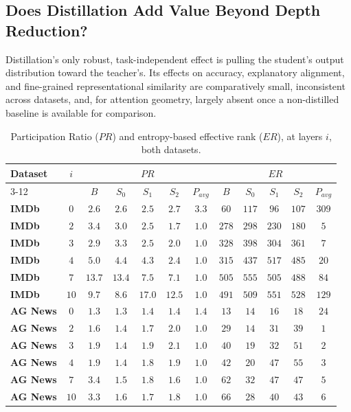 \documentclass[conference]{IEEEtran}
\begin{document}
\subsection{Does Distillation Add Value Beyond Depth Reduction?}\label{sec:distillation-value}

Distillation's only robust, task-independent effect is pulling the student's output distribution toward the teacher's. Its effects on accuracy, explanatory alignment, and fine-grained representational similarity are comparatively small, inconsistent across datasets, and, for attention geometry, largely absent once a non-distilled baseline is available for comparison.

\begin{table}[tb]
\centering
\caption{Participation Ratio ($PR$) and entropy-based effective rank ($ER$), at layers $i$, both datasets.}
\footnotesize
\begin{tabular}{|l|c|c|c|c|c|c|c|c|c|c|c|}
\hline
\multirow{2}{*}{Dataset} & \multirow{2}{*}{$i$} & \multicolumn{5}{c|}{$PR$} & \multicolumn{5}{c|}{$ER$} \\
\cline{3-12}
 & & $B$ & $S_0$ & $S_1$ & $S_2$ & $P_{avg}$ & $B$ & $S_0$ & $S_1$ & $S_2$ & $P_{avg}$ \\ \hline
\textbf{IMDb} & $0$ & $2.6$ & $2.6$ & $2.5$ & $2.7$ & $3.3$ & $60$ & $117$ & $96$ & $107$ & $309$ \\
\textbf{IMDb} & $2$ & $3.4$ & $3.0$ & $2.5$ & $1.7$ & $1.0$ & $278$ & $298$ & $230$ & $180$ & $5$ \\
\textbf{IMDb} & $3$ & $2.9$ & $3.3$ & $2.5$ & $2.0$ & $1.0$ & $328$ & $398$ & $304$ & $361$ & $7$ \\
\textbf{IMDb} & $4$ & $5.0$ & $4.4$ & $4.3$ & $2.4$ & $1.0$ & $315$ & $437$ & $517$ & $485$ & $20$ \\
\textbf{IMDb} & $7$ & $13.7$ & $13.4$ & $7.5$ & $7.1$ & $1.0$ & $505$ & $555$ & $505$ & $488$ & $84$ \\
\textbf{IMDb} & $10$ & $9.7$ & $8.6$ & $17.0$ & $12.5$ & $1.0$ & $491$ & $509$ & $551$ & $528$ & $129$ \\
\hline
\textbf{AG News} & $0$ & $1.3$ & $1.3$ & $1.4$ & $1.4$ & $1.4$ & $13$ & $14$ & $16$ & $18$ & $24$ \\
\textbf{AG News} & $2$ & $1.6$ & $1.4$ & $1.7$ & $2.0$ & $1.0$ & $29$ & $14$ & $31$ & $39$ & $1$ \\
\textbf{AG News} & $3$ & $1.9$ & $1.4$ & $1.9$ & $2.1$ & $1.0$ & $40$ & $19$ & $32$ & $51$ & $2$ \\
\textbf{AG News} & $4$ & $1.9$ & $1.4$ & $1.8$ & $1.9$ & $1.0$ & $42$ & $20$ & $47$ & $55$ & $3$ \\
\textbf{AG News} & $7$ & $3.4$ & $1.5$ & $1.8$ & $1.6$ & $1.0$ & $62$ & $32$ & $47$ & $47$ & $5$ \\
\textbf{AG News} & $10$ & $3.3$ & $1.6$ & $1.7$ & $1.8$ & $1.0$ & $66$ & $28$ & $40$ & $43$ & $6$ \\ \hline
\end{tabular}
\label{tab:spectral}
\end{table}
\end{document}
